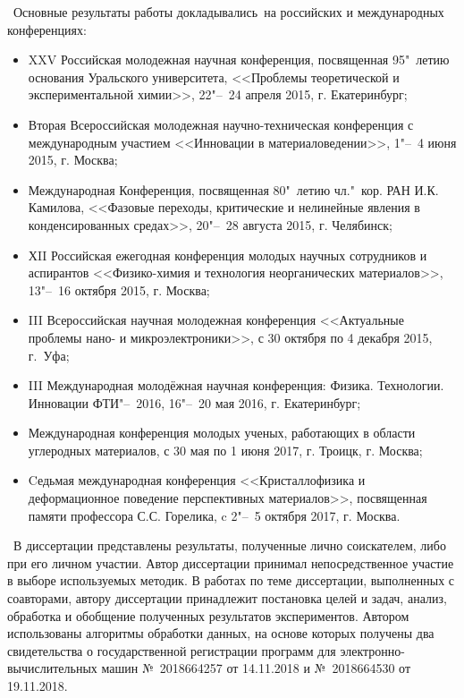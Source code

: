 \probation\
Основные результаты работы докладывались~на российских и международных конференциях:
\begin{itemize}
\item  XXV Российская молодежная научная конференция, посвященная 95"~летию основания Уральского университета, <<Проблемы теоретической и экспериментальной химии>>, 22"--~24 апреля 2015, г. Екатеринбург;
\item Вторая Всероссийская молодежная научно-техническая конференция с международным участием <<Инновации в материаловедении>>, 1"--~4 июня 2015, г. Москва;
\item Международная Конференция, посвященная 80"~летию чл."~кор. РАН И.К. Камилова, <<Фазовые переходы, критические и нелинейные явления в конденсированных средах>>,  20"--~28 августа 2015, г. Челябинск;
\item ХII Российская ежегодная конференция молодых научных сотрудников и аспирантов <<Физико-химия и технология неорганических материалов>>, 13"--~16 октября 2015, г. Москва;
\item III Всероссийская научная молодежная конференция
<<Актуальные проблемы нано- и микроэлектроники>>, с 30 октября по 4 декабря 2015, г.~Уфа;
\item III Международная молодёжная научная конференция: Физика. Технологии. Инновации ФТИ"--~2016, 16"--~20 мая 2016, г. Екатеринбург;
\item Международная конференция молодых ученых, работающих в области углеродных материалов, с 30 мая по 1 июня 2017, г. Троицк, г. Москва;
\item Cедьмая международная конференция <<Кристаллофизика и деформационное поведение перспективных материалов>>, посвященная памяти профессора С.С. Горелика, c 2"--~5 октября 2017, г. Москва.
\end{itemize}


\contribution\ В диссертации представлены результаты, полученные лично соискателем, либо при его личном участии. Автор диссертации принимал непосредственное участие в выборе используемых методик. В работах по теме диссертации, выполненных с соавторами, автору диссертации принадлежит постановка целей и задач, анализ, обработка и обобщение полученных результатов экспериментов. Автором использованы алгоритмы обработки данных, на основе которых получены два свидетельства о государственной регистрации программ для электронно-вычислительных машин №~2018664257 от 14.11.2018 и №~2018664530 от 19.11.2018.


